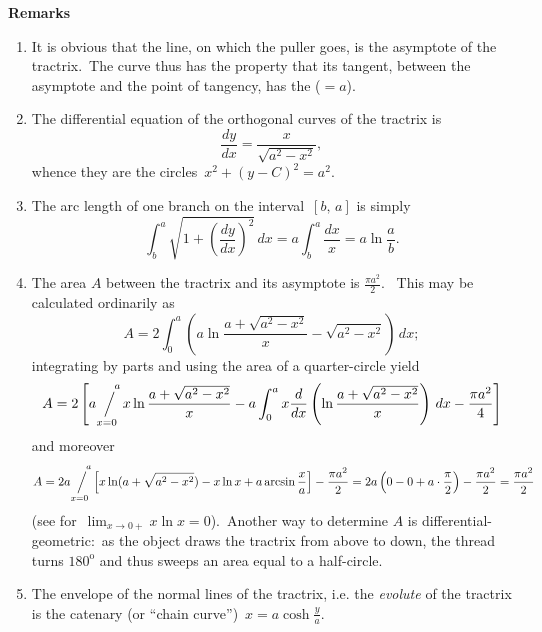\documentclass[12pt]{article}
\newcommand{\sijoitus}[2]%
{\operatornamewithlimits{\Big/}_{\!\!\!#1}^{\,#2}}
\theoremstyle{definition}
\begin{document}
\textbf{Remarks}
\begin{enumerate}
\item It is obvious that the line, on which the puller goes, is the asymptote of the tractrix. \,The curve thus has the property that its tangent, between the asymptote and the point of tangency, has the  ($= a$). 
\item The differential equation of the orthogonal curves of the tractrix is
$$\frac{dy}{dx} = \frac{x}{\sqrt{a^2-x^2}},$$
whence they are the circles \,$x^2+(y-C)^2 = a^2$.
\item The arc length of one branch on the interval \,$[b,\,a]$ is simply
  $$\int_b^a\sqrt{1+\left(\frac{dy}{dx}\right)^2}\,dx = a\int_b^a\frac{dx}{x} = 
 a\ln\frac{a}{b}.$$
\item The area $A$ between the tractrix and its asymptote is $\frac{\pi a^2}{2}$. \, This may be calculated ordinarily as
$$A = 2\int_0^a(a\ln{\frac{a+\sqrt{a^2-x^2}}{x}}-\sqrt{a^2-x^2})\,dx;$$
integrating by parts and using the area of a quarter-circle yield
$$A = 2\left[a\sijoitus{x=0}{\quad a}x\ln\frac{a+\sqrt{a^2-x^2}}{x}
-a\int_0^ax\frac{d}{dx}\left(\ln\frac{a+\sqrt{a^2-x^2}}{x}\right)\,dx-\frac{\pi a^2}{4}\right]$$
and moreover   
$$A = 2a\sijoitus{x=0}{\quad a}
\left[x\ln(a+\sqrt{a^2-x^2})-x\ln{x}+a\arcsin\frac{x}{a}\right]-
\frac{\pi a^2}{2}
 = 2a\left(0-0+a\cdot \frac{\pi}{2}\right)-\frac{\pi a^2}{2} = \frac{\pi a^2}{2}$$
(see  for\, $\lim_{x\to 0+}x\ln{x} = 0$).\, Another way to determine $A$ is differential-geometric:\, as the object draws the  tractrix from above to down, the thread turns $180^{\mathrm{o}}$ and thus sweeps an area equal to a half-circle.
\item The envelope of the normal lines of the tractrix, i.e. the {\em evolute} of the tractrix is the catenary (or ``chain curve'')\, $x = a\cosh{\frac{y}{a}}$.
\end{enumerate}
\end{document}

